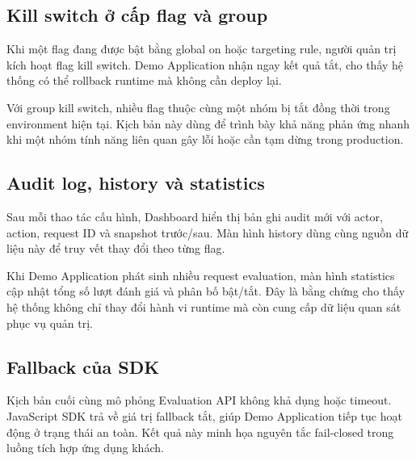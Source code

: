 \subsection{Kill switch ở cấp flag và group}

Khi một flag đang được bật bằng global on hoặc targeting rule, người quản trị kích hoạt flag kill switch. Demo Application nhận ngay kết quả tắt, cho thấy hệ thống có thể rollback runtime mà không cần deploy lại.

Với group kill switch, nhiều flag thuộc cùng một nhóm bị tắt đồng thời trong environment hiện tại. Kịch bản này dùng để trình bày khả năng phản ứng nhanh khi một nhóm tính năng liên quan gây lỗi hoặc cần tạm dừng trong production.

\subsection{Audit log, history và statistics}

Sau mỗi thao tác cấu hình, Dashboard hiển thị bản ghi audit mới với actor, action, request ID và snapshot trước/sau. Màn hình history dùng cùng nguồn dữ liệu này để truy vết thay đổi theo từng flag.

Khi Demo Application phát sinh nhiều request evaluation, màn hình statistics cập nhật tổng số lượt đánh giá và phân bố bật/tắt. Đây là bằng chứng cho thấy hệ thống không chỉ thay đổi hành vi runtime mà còn cung cấp dữ liệu quan sát phục vụ quản trị.

\subsection{Fallback của SDK}

Kịch bản cuối cùng mô phỏng Evaluation API không khả dụng hoặc timeout. JavaScript SDK trả về giá trị fallback tắt, giúp Demo Application tiếp tục hoạt động ở trạng thái an toàn. Kết quả này minh họa nguyên tắc fail-closed trong luồng tích hợp ứng dụng khách.
